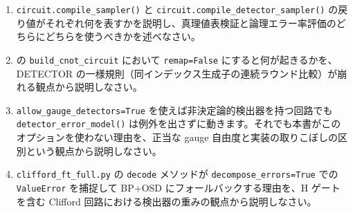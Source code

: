 \begin{exercise}
  \begin{enumerate}
    \item \texttt{circuit.compile\_sampler()} と \texttt{circuit.compile\_detector\_sampler()} の戻り値がそれぞれ何を表すかを説明し、真理値表検証と論理エラー率評価のどちらにどちらを使うべきかを述べなさい。
    \item {} の \texttt{build\_cnot\_circuit} において \texttt{remap=False} にすると何が起きるかを、DETECTOR の一様規則（同インデックス生成子の連続ラウンド比較）が崩れる観点から説明しなさい。
    \item \texttt{allow\_gauge\_detectors=True} を使えば非決定論的検出器を持つ回路でも \texttt{detector\_error\_model()} は例外を出さずに動きます。それでも本書がこのオプションを使わない理由を、正当な gauge 自由度と実装の取りこぼしの区別という観点から説明しなさい。
    \item \texttt{clifford\_ft\_full.py} の \texttt{decode} メソッドが \texttt{decompose\_errors=True} での \texttt{ValueError} を捕捉して BP+OSD にフォールバックする理由を、H ゲートを含む Clifford 回路における検出器の重みの観点から説明しなさい。
  \end{enumerate}
\end{exercise}
